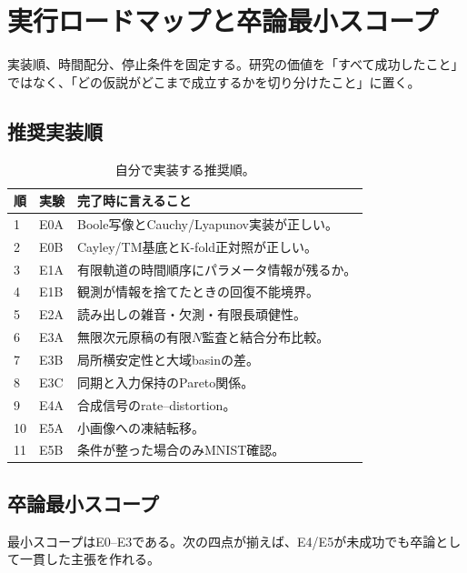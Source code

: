 \documentclass[a4paper,11pt,oneside,openany]{ltjsbook}
\begin{document}
\chapter{実行ロードマップと卒論最小スコープ}
\label{chap:roadmap}

\begin{purposebox}
実装順、時間配分、停止条件を固定する。研究の価値を「すべて成功したこと」ではなく、「どの仮説がどこまで成立するかを切り分けたこと」に置く。
\end{purposebox}

\section{推奨実装順}

\begin{table}[htbp]
\centering
\caption{自分で実装する推奨順。}
\label{tab:implementation_order}
\begin{tabularx}{\textwidth}{p{15mm}p{42mm}X}
\toprule
順 & 実験 & 完了時に言えること \\
\midrule
1 & E0A & Boole写像とCauchy/Lyapunov実装が正しい。\\
2 & E0B & Cayley/TM基底とK-fold正対照が正しい。\\
3 & E1A & 有限軌道の時間順序にパラメータ情報が残るか。\\
4 & E1B & 観測が情報を捨てたときの回復不能境界。\\
5 & E2A & 読み出しの雑音・欠測・有限長頑健性。\\
6 & E3A & 無限次元原稿の有限\(N\)監査と結合分布比較。\\
7 & E3B & 局所横安定性と大域basinの差。\\
8 & E3C & 同期と入力保持のPareto関係。\\
9 & E4A & 合成信号のrate--distortion。\\
10 & E5A & 小画像への凍結転移。\\
11 & E5B & 条件が整った場合のみMNIST確認。\\
\bottomrule
\end{tabularx}
\end{table}

\section{卒論最小スコープ}

最小スコープはE0--E3である。次の四点が揃えば、E4/E5が未成功でも卒論として一貫した主張を作れる。
\end{document}
